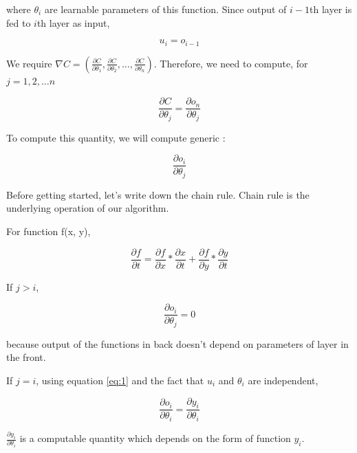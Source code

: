 \documentclass[a4paper]{tufte-handout}
\begin{document}
where \(\theta_i\) are learnable parameters of this function. Since
output of \(i-1\)th layer is fed to \(i\)th layer as input,

\begin{equation}
u_i = o_{i-1} \label{eq:2}
\end{equation}


We require
\(\nabla C = \left(\frac{\partial C}{\partial\theta_1}, \frac{\partial C}{\partial\theta_2}, \ldots, \frac{\partial C}{\partial\theta_n}\right)\).
Therefore, we need to compute, for  \( j = 1, 2, \dots n \)

\[ \frac{\partial C}{\partial\theta_j} = \frac{\partial o_n}{\partial\theta_j} \]

To compute this quantity, we will compute generic
:

\[ \frac{\partial o_i}{\partial \theta_j} \]

Before getting started, let's write down the chain rule. Chain rule is
the underlying operation of our algorithm.

\begin{framed}
For function f(x, y), 

\begin{equation}
\frac{\partial f}{\partial t} = \frac{\partial f}{\partial x} * \frac{\partial x}{\partial t} + \frac{\partial f}{\partial y} * \frac{\partial y}{\partial t}
\label{eq:3}
\end{equation}

\end{framed}

If \(j > i\),

\begin{equation}
\frac{\partial o_i}{\partial \theta_j} = 0 \label{eq:4}
\end{equation}


because output of the functions in back doesn't depend on parameters of
layer in the front.

If \(j = i\), using equation \eqref{eq:1} and the fact that \(u_i\) and
\(\theta_i\) are independent,

\begin{equation}
\frac{\partial o_i}{\partial \theta_i} = \frac{\partial y_i}{\partial \theta_i}
 \label{eq:5}
\end{equation}

\(\frac{\partial y_i}{\partial \theta_i}\) is a computable quantity
which depends on the form of function \(y_i\).
\end{document}
